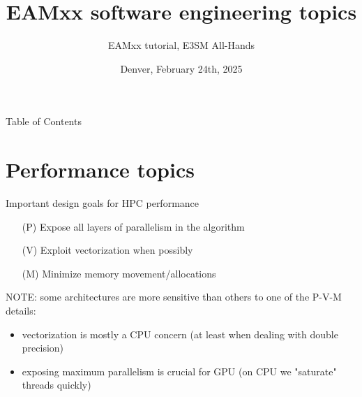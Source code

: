 \documentclass[8pt,NM,theme=angles,number=2023-00000]{sandia-beamer}
\title{EAMxx software engineering topics}
\author{\centering{L.Bertagna}}
\subtitle{EAMxx tutorial, E3SM All-Hands}
\date{Denver, February 24th, 2025}
\begin{document}
\begin{frame}
  \maketitle
\end{frame}

\begin{frame}{Table of Contents}
    \tableofcontents
\end{frame}

\section{Performance topics}
\begin{frame}{Important design goals for HPC performance}
  \begin{itemize}
    \item [(P)] Expose all layers of parallelism in the algorithm
    \item [(V)] Exploit vectorization when possibly
    \item [(M)] Minimize memory movement/allocations
  \end{itemize}

  \vspace{1cm}
  NOTE: some architectures are more sensitive than others to one of the P-V-M details:
  \begin{itemize}
    \item vectorization is mostly a CPU concern (at least when dealing with double precision)
    \item exposing maximum parallelism is crucial for GPU (on CPU we "saturate" threads quickly)
  \end{itemize}

\end{frame}
\end{document}
